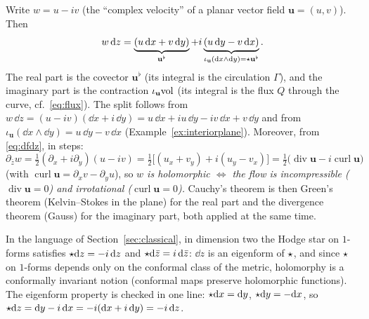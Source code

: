Write $w=u-iv$ (the ``complex velocity'' of a planar vector field $\mathbf u=(u,v)$). Then
\begin{equation}\label{eq:wdz}
w\,\mathrm{d} z=\underbrace{(u\,\mathrm{d} x+v\,\mathrm{d} y)}_{\mathbf u^\flat}+i\underbrace{(u\,\mathrm{d} y-v\,\mathrm{d} x)}_{\iota_{\mathbf u}(\mathrm{d} x\wedge\mathrm{d} y)=\star\mathbf u^\flat}.
\end{equation}
The real part is the covector $\mathbf u^\flat$ (its integral is the circulation $\Gamma$), and the imaginary part is the contraction $\iota_{\mathbf u}\mathrm{vol}$ (its integral is the flux $Q$ through the curve, cf.\ \eqref{eq:flux}). The split follows from $w\,\dd z=(u-iv)(\dd x+i\,\dd y)=u\,\dd x+iu\,\dd y-iv\,\dd x+v\,\dd y$ and from $\iota_{\mathbf u}(\dd x\wedge\dd y)=u\,\dd y-v\,\dd x$ (Example~\ref{ex:interiorplane}). Moreover, from \eqref{eq:dfdz}, in steps:
\[
\partial_{\bar z}w=\tfrac12(\partial_x+i\partial_y)(u-iv)=\tfrac12\bigl[(u_x+v_y)+i(u_y-v_x)\bigr]=\tfrac12\bigl(\operatorname{div}\mathbf u-i\operatorname{curl}\mathbf u\bigr)
\]
(with $\operatorname{curl}\mathbf u=\partial_xv-\partial_yu$), 
so \emph{$w$ is holomorphic $\iff$ the flow is incompressible ($\operatorname{div}\mathbf u=0$) and irrotational ($\operatorname{curl}\mathbf u=0$).}
Cauchy's theorem is then Green's theorem (Kelvin--Stokes in the plane) for the real part and the divergence theorem (Gauss) for the imaginary part, both applied at the same time.

\begin{specialcase}\label{sc:hodge2}
In the language of Section~\ref{sec:classical}, in dimension two the Hodge star on $1$-forms satisfies $\star\mathrm{d} z=-i\,\mathrm{d} z$ and $\star\mathrm{d}\bar z=i\,\mathrm{d}\bar z$: $\dd z$ is an eigenform of $\star$, and since $\star$ on $1$-forms depends only on the conformal class of the metric, holomorphy is a conformally invariant notion (conformal maps preserve holomorphic functions). The eigenform property is checked in one line: $\star\mathrm{d} x=\mathrm{d} y$, $\star\mathrm{d} y=-\mathrm{d} x$, so $\star\mathrm{d} z=\mathrm{d} y-i\,\mathrm{d} x=-i(\mathrm{d} x+i\,\mathrm{d} y)=-i\,\mathrm{d} z$.
\end{specialcase}
